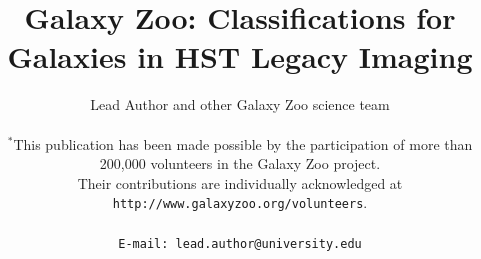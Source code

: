 \documentclass[usenatbib]{mn2e}
\newcommand{\etal}{{\it et al.}}
\begin{document}
\title[Galaxy Zoo Hubble Data]{Galaxy Zoo: Classifications for Galaxies in HST Legacy Imaging}
\author[Lead Author \etal]{Lead Author and other Galaxy Zoo science team\\
\\
 $^*$This publication has been made possible by the participation of more than 200,000 volunteers in the Galaxy Zoo project. \\ Their contributions are individually acknowledged at \texttt{http://www.galaxyzoo.org/volunteers}. \\
\\
{\tt E-mail: lead.author@university.edu}
 }

\end{document}
